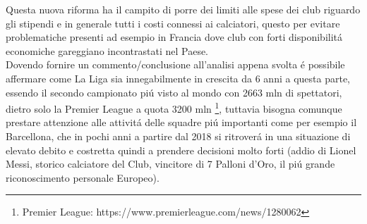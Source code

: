 \documentclass[
    corpo=12pt,
    oneside,
    evenboxes,
    tipotesi=triennale,
    stile=classica,
    oldstyle,
    autoretitolo,
    greek,
]{toptesi}
\begin{document}
\begin{interlinea}{1.5}
Questa nuova riforma ha il campito di porre dei limiti alle spese dei club riguardo gli stipendi e in generale tutti i costi connessi ai calciatori,
questo per evitare problematiche presenti ad esempio in Francia dove club con forti disponibilit\'a economiche gareggiano incontrastati nel Paese.\\
Dovendo fornire un commento/conclusione all'analisi appena svolta \'e possibile affermare come La Liga sia innegabilmente in crescita da 6 
anni a questa parte, essendo il secondo campionato pi\'u visto al mondo con 2663 mln di spettatori, dietro solo la Premier League a quota 
3200 mln \footnote{Premier League: https://www.premierleague.com/news/1280062}, tuttavia bisogna comunque prestare attenzione alle attivit\'a
delle squadre pi\'u importanti come per esempio il Barcellona, che in pochi anni a partire dal 2018 si ritrover\'a in una situazione di
elevato debito e costretta quindi a prendere decisioni molto forti (addio di Lionel Messi, storico calciatore del Club, vincitore di 7 Palloni d'Oro,
il pi\'u grande riconoscimento personale Europeo).
\end{interlinea}
\end{document}
